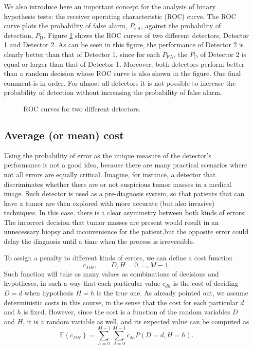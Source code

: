 We also introduce here an important concept for the analysis of binary hypothesis tests: the receiver operating characteristic (ROC) curve. The ROC curve plots the probability of false alarm, $P_\text{FA}$, against the probability of detection, $P_\text{D}$. Figure \ref{fig:ROC} shows the ROC curves of two different detectors, Detector 1 and Detector 2. As can be seen in this figure, the performance of Detector 2 is clearly better than that of Detector 1, since for each $P_\text{FA}$, the $P_\text{D}$ of Detector 2 is equal or larger than that of Detector 1. Moreover, both detectors perform better than a random decision whose ROC curve is also shown in the figure. One final comment is in order. For almost all detectors it is not possible to increase the probability of detection without increasing the probability of false alarm.

\begin{figure}
        \begin{center}
			
	\end{center}
	\caption{ROC curves for two different detectors.\label{fig:ROC}}
\end{figure}

\subsection{Average (or mean) cost}

Using the probability of error as the unique measure of the detector's performance is not a good idea, because there are many practical scenarios where not all errors are equally critical. Imagine, for instance, a detector that discriminates whether there are or not suspicious tumor masses in a medical image. Such detector is used as a pre-diagnosis system, so that patients that can have a tumor are then explored with more accurate (but also invasive) techniques. In this case, there is a clear asymmetry between both kinds of errors: The incorrect decision that tumor masses are present would result in an unnecessary biopsy and inconvenience for the patient,but the opposite error could delay the diagnosis until a time when the process is irreversible.

To assign a penalty to different kinds of errors, we can define a cost function $$c_{DH}, \qquad D,H = 0, \ldots, M-1.$$ Such function will take as many values as combinations of decisions and hypotheses, in such a way that each particular value $c_{dh}$ is the cost of deciding $D=d$ when hypothesis $H=h$ is the true one. As already pointed out, we assume deterministic costs in this course, in the sense that the cost for each particular $d$ and $h$ is fixed. However, since the cost is a function of the random variables $D$ and $H$, it is a random variable as well, and its expected value can be computed as
$$\mathbb{E}\left\{ c_{DH}\right\} = \sum_{h=0}^{M-1} \sum_{d=0}^{M-1} c_{dh} P(D=d, H=h).$$

